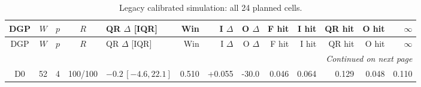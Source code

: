 \begingroup
\fontsize{9}{10.2}\selectfont
\setlength{\tabcolsep}{2.2pt}
\renewcommand{\arraystretch}{1.05}
\setlength{\LTpre}{2pt}
\setlength{\LTpost}{3pt}
\begin{longtable}{crrcp{33mm}rrrrrrrr}
\caption{Legacy calibrated simulation: all 24 planned cells.}\label{tab:v9-legacy-mc}\\
\toprule
DGP & $W$ & $p$ & $R$ & QR $\Delta$ [IQR] & Win & I $\Delta$ & O $\Delta$ & F hit & I hit & QR hit & O hit & $\infty$\\
\midrule
\endfirsthead
\toprule
DGP & $W$ & $p$ & $R$ & QR $\Delta$ [IQR] & Win & I $\Delta$ & O $\Delta$ & F hit & I hit & QR hit & O hit & $\infty$\\
\midrule
\endhead
\midrule
\multicolumn{13}{r}{\emph{Continued on next page}}\\
\endfoot
\bottomrule
\endlastfoot
D0 & 52 & 4 & 100/100 & \(-0.2\,[-4.6,22.1]\) & 0.510 & +0.055 & -30.0 & 0.046 & 0.064 & 0.129 & 0.048 & 0.110\\

\end{longtable}
